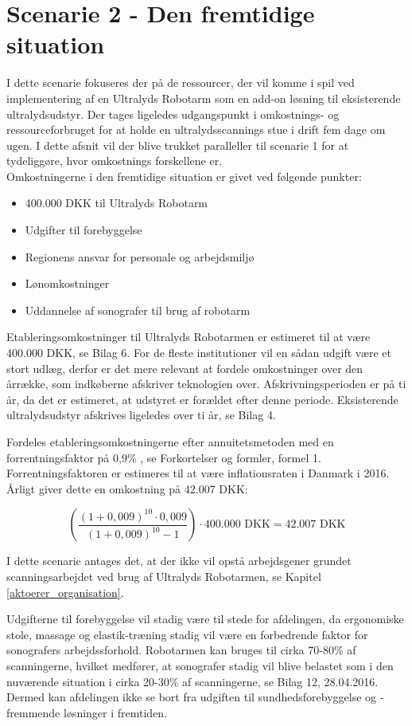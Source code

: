 \section{Scenarie 2 - Den fremtidige situation} \label{fremtidige}
I dette scenarie fokuseres der på de ressourcer, der vil komme i spil ved implementering af en Ultralyds Robotarm som en add-on løsning til eksisterende ultralydsudstyr. Der tages ligeledes udgangspunkt i omkostnings- og ressourceforbruget for at holde en ultralydsscannings stue i drift fem dage om ugen. I dette afsnit vil der blive trukket paralleller til scenarie 1 for at tydeliggøre, hvor omkostnings forskellene er. \\
Omkostningerne i den fremtidige situation er givet ved følgende punkter:
\begin{itemize}
\item 400.000 DKK til Ultralyds Robotarm
\item Udgifter til forebyggelse
\item Regionens ansvar for personale og arbejdsmiljø
\item Lønomkostninger
\item Uddannelse af sonografer til brug af robotarm
\end{itemize}
Etableringsomkostninger til Ultralyds Robotarmen er estimeret til at være 400.000 DKK, se Bilag 6.
For de fleste institutioner vil en sådan udgift være et stort udlæg, derfor er det mere relevant at fordele omkostninger over den årrække, som indkøberne afskriver teknologien over. Afskrivningsperioden er på ti år, da det er estimeret, at udstyret er forældet efter denne periode. Eksisterende ultralydsudstyr afskrives ligeledes over ti år, se Bilag 4.

Fordeles etableringsomkostningerne efter annuitetsmetoden med en forrentningsfaktor på 0,9\% \cite{Inflationsrate}, se Forkortelser og formler, formel 1. Forrentningsfaktoren er estimeres til at være inflationsraten i Danmark i 2016. Årligt giver dette en omkostning på 42.007 DKK:

\begin{equation}
\left(\frac{(1+0,009)^{10}\cdot0,009}{(1+0,009)^{10}-1}\right)\cdot400.000 \text{ DKK}=42.007 \text{ DKK}
\end{equation}

I dette scenarie antages det, at der ikke vil opstå arbejdsgener grundet scanningsarbejdet ved brug af Ultralyds Robotarmen, se Kapitel \ref{aktoerer_organisation}. 

Udgifterne til forebyggelse vil stadig være til stede for afdelingen, da ergonomiske stole, massage og elastik-træning stadig vil være en forbedrende faktor for sonografers arbejdssforhold. Robotarmen kan bruges til cirka 70-80\% af scanningerne, hvilket medfører, at sonografer stadig vil blive belastet som i den nuværende situation i cirka 20-30\% af scanningerne, se Bilag 12, 28.04.2016. Dermed kan afdelingen ikke se bort fra udgiften til sundhedsforebyggelse og -fremmende løsninger i fremtiden.  

